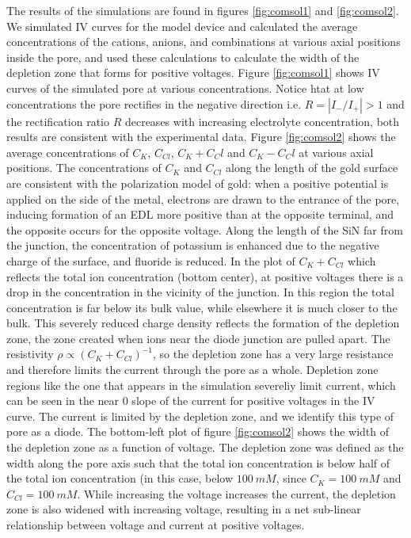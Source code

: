 		The results of the simulations are found in figures \ref{fig:comsol1} and \ref{fig:comsol2}. We simulated IV curves for the model device and calculated the average concentrations of the cations, anions, and combinations at various axial positions inside the pore, and used these calculations to calculate the width of the depletion zone that forms for positive voltages. Figure \ref{fig:comsol1} shows IV curves of the simulated pore at various concentrations. Notice htat at low concentrations the pore rectifies in the negative direction i.e. $R=|I_{-}/I_{+}|>1$ and the rectification ratio $R$ decreases with increasing electrolyte concentration, both results are consistent with the experimental data. Figure \ref{fig:comsol2} shows the average concentrations of $C_{K}$, $C_{Cl}$, $C_K+C_Cl$ and $C_K-C_Cl$ at various axial positions. The concentrations of $C_{K}$ and $C_{Cl}$ along the length of the gold surface are consistent with the polarization model of gold: when a positive potential is applied on the side of the metal, electrons are drawn to the entrance of the pore, inducing formation of an EDL more positive than at the opposite terminal, and the opposite occurs for the opposite voltage. Along the length of the SiN far from the junction, the concentration of potassium is enhanced due to the negative charge of the surface, and fluoride is reduced. In the plot of $C_{K}+C_{Cl}$ which reflects the total ion concentration (bottom center), at positive voltages there is a drop in the concentration in the vicinity of the junction. In this region the total concentration is far below its bulk value, while elsewhere it is much closer to the bulk. This severely reduced charge density reflects the formation of the depletion zone, the zone created when ions near the diode junction are pulled apart. The resistivity $\rho\propto \left(C_{K}+C_{Cl}\right)^{-1}$, so the depletion zone has a very large resistance and therefore limits the current through the pore as a whole. Depletion zone regions like the one that appears in the simulation severeliy limit current, which can be seen in the near 0 slope of the current for positive voltages in the IV curve. The current is limited by the depletion zone, and we identify this type of pore as a diode. The bottom-left plot of figure \ref{fig:comsol2} shows the width of the depletion zone as a function of voltage. The depletion zone was defined as the width along the pore axis such that the total ion concentration is below half of the total ion concentration (in this case, below $\SI{100}{mM}$, since $C_{K}=\SI{100}{mM}$ and $C_{Cl}=\SI{100}{mM}$. While increasing the voltage increases the current, the depletion zone is also widened with increasing voltage, resulting in a net sub-linear relationship between voltage and current at positive voltages.
		
